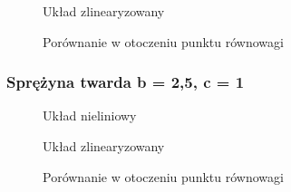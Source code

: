 \documentclass[a4paper, 10pt]{article}
\begin{document}
				
				\begin{figure}[H]
					\centering
					\def \svgwidth{0.8\columnwidth}
					
					\caption{Układ zlinearyzowany}
				\end{figure}\noindent
				
				
				\begin{figure}[H]
					\centering
					\def \svgwidth{0.8\columnwidth}
					
					\caption{Porównanie w otoczeniu punktu równowagi}
				\end{figure}\noindent
				
			\subsubsection{Sprężyna twarda b = 2,5, c = 1}
				\begin{figure}[H]
					\centering
					\def \svgwidth{0.8\columnwidth}
					
					\caption{Układ nieliniowy}
				\end{figure}\noindent
				
				
				\begin{figure}[H]
					\centering
					\def \svgwidth{0.8\columnwidth}
					
					\caption{Układ zlinearyzowany}
				\end{figure}\noindent
				
				
				\begin{figure}[H]
					\centering
					\def \svgwidth{0.8\columnwidth}
					
					\caption{Porównanie w otoczeniu punktu równowagi}
				\end{figure}\newpage
				
				
\end{document}
